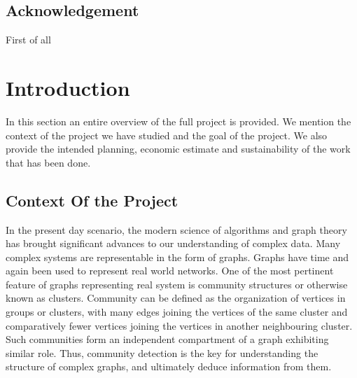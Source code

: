 \newpage
\clearpage
\newpage
\section*{Acknowledgement}
First of all
\newpage

\tableofcontents
\newpage

\chapter{Introduction}

\setcounter{page}{1}
\par In this section an entire overview of the full project is provided. We mention the context of the project we have studied and the goal of the project. We also provide the intended planning, economic estimate and sustainability of the work that has been done.


\section{Context Of the Project}
\par In the present day scenario, the modern science of algorithms and graph theory has brought significant advances to our understanding of complex data. Many complex systems are representable in the form of graphs. Graphs have time and again been used to represent real world networks. One of the most pertinent feature of graphs representing real system is community structures or otherwise known as clusters. Community can be defined as the organization of vertices in groups or clusters, with many edges joining the vertices of the same cluster and comparatively fewer vertices joining the vertices in another neighbouring cluster. Such communities form an independent compartment of a graph exhibiting similar role.
Thus, community detection is the key for understanding the structure of complex graphs, and ultimately deduce information from them.

